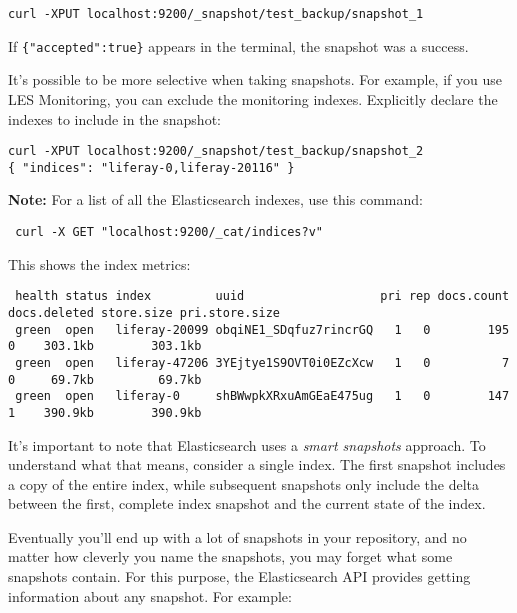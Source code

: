 \begin{verbatim}
curl -XPUT localhost:9200/_snapshot/test_backup/snapshot_1
\end{verbatim}

If \texttt{\{"accepted":true\}} appears in the terminal, the snapshot
was a success.

It's possible to be more selective when taking snapshots. For example,
if you use LES Monitoring, you can exclude the monitoring indexes.
Explicitly declare the indexes to include in the snapshot:

\begin{verbatim}
curl -XPUT localhost:9200/_snapshot/test_backup/snapshot_2
{ "indices": "liferay-0,liferay-20116" }
\end{verbatim}

\noindent\hrulefill

\textbf{Note:} For a list of all the Elasticsearch indexes, use this
command:

\begin{verbatim}
 curl -X GET "localhost:9200/_cat/indices?v"
\end{verbatim}

This shows the index metrics:

\begin{verbatim}
 health status index         uuid                   pri rep docs.count docs.deleted store.size pri.store.size
 green  open   liferay-20099 obqiNE1_SDqfuz7rincrGQ   1   0        195            0    303.1kb        303.1kb
 green  open   liferay-47206 3YEjtye1S9OVT0i0EZcXcw   1   0          7            0     69.7kb         69.7kb
 green  open   liferay-0     shBWwpkXRxuAmGEaE475ug   1   0        147            1    390.9kb        390.9kb
\end{verbatim}

\noindent\hrulefill

It's important to note that Elasticsearch uses a \emph{smart snapshots}
approach. To understand what that means, consider a single index. The
first snapshot includes a copy of the entire index, while subsequent
snapshots only include the delta between the first, complete index
snapshot and the current state of the index.

Eventually you'll end up with a lot of snapshots in your repository, and
no matter how cleverly you name the snapshots, you may forget what some
snapshots contain. For this purpose, the Elasticsearch API provides
getting information about any snapshot. For example:


